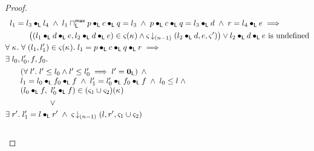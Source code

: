\begin{lemma}[]
\begin{proof}
\begin{align}
	& \hspace*{0.2cm} l_1 = l_3 \composeL l_4 \;\land\; l_1 \maxMeetL p \composeL c \composeL q = l_3 \;\land\; p \composeL c \composeL q = l_3 \composeL d \;\land\; r = l_4 \composeL e \implies \nonumber\\
	&\hspace*{1cm} \left((l_1 \composeL d \composeL e, l_2 \composeL d \composeL e) \in \amod{}(\ca{}) \land
	\extendsAMUpto{\amod}{(n-1)}{l_2 \composeL d}{e}{\amod{}'}\right) \lor l_2 \composeL d \composeL e \text{ is undefined} \label{LM:Goal1}\\
%
	&\for{\ca{}} \for{(l_1, l'_1) \in \amod{}(\ca{})} l_1 = p \composeL c \composeL q \composeL r \implies \nonumber\\
	&\exsts{l_0, l'_0, f, f_0} \nonumber\\
  &\hspace*{0.5cm}
  \begin{array}{l}
  	\left(\for{l'} l' \leq l_0 \land l' \leq l'_0 \implies l' = \unitL\right)\;\land\\
  	l_1 = l_0 \composeL f_0 \composeL f \;\land\; l'_1 = l'_0 \composeL f_0 \composeL f \;\land\; l_0 \leq l \;\land\\
  	(l_0 \composeL f,\ l'_0 \composeL f) \in (\amod{1} \cup \amod{2})(\ca{}) 
  \end{array} \nonumber\\
%
	&\hspace*{2cm}\lor  \nonumber\\
	&\exsts{r'} l'_1 = l \composeL r' \;\land\; \extendsAMUpto{\amod}{(n-1)}{l}{r'}{\amod{1} \cup \amod{2}}\label{LM:Goal2}\\\nonumber
\end{align}
%


\end{proof}
\end{lemma}
